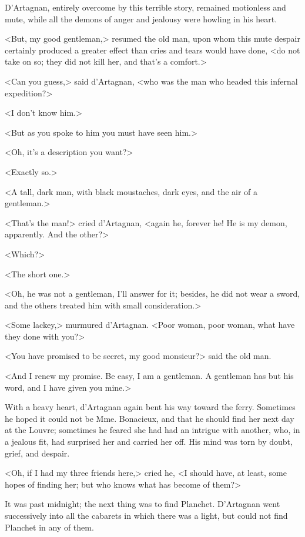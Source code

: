 D'Artagnan, entirely overcome by this terrible story, remained motionless and mute, while all the demons of anger and jealousy were howling in his heart. 

<But, my good gentleman,> resumed the old man, upon whom this mute despair certainly produced a greater effect than cries and tears would have done, <do not take on so; they did not kill her, and that's a comfort.> 

<Can you guess,> said d'Artagnan, <who was the man who headed this infernal expedition?> 

<I don't know him.> 

<But as you spoke to him you must have seen him.> 

<Oh, it's a description you want?> 

<Exactly so.> 

<A tall, dark man, with black moustaches, dark eyes, and the air of a gentleman.> 

<That's the man!> cried d'Artagnan, <again he, forever he! He is my demon, apparently. And the other?> 

<Which?> 

<The short one.> 

<Oh, he was not a gentleman, I'll answer for it; besides, he did not wear a sword, and the others treated him with small consideration.> 

<Some lackey,> murmured d'Artagnan. <Poor woman, poor woman, what have they done with you?> 

<You have promised to be secret, my good monsieur?> said the old man. 

<And I renew my promise. Be easy, I am a gentleman. A gentleman has but his word, and I have given you mine.> 

With a heavy heart, d'Artagnan again bent his way toward the ferry. Sometimes he hoped it could not be Mme. Bonacieux, and that he should find her next day at the Louvre; sometimes he feared she had had an intrigue with another, who, in a jealous fit, had surprised her and carried her off. His mind was torn by doubt, grief, and despair. 

<Oh, if I had my three friends here,> cried he, <I should have, at least, some hopes of finding her; but who knows what has become of them?> 

It was past midnight; the next thing was to find Planchet. D'Artagnan went successively into all the cabarets in which there was a light, but could not find Planchet in any of them. 

